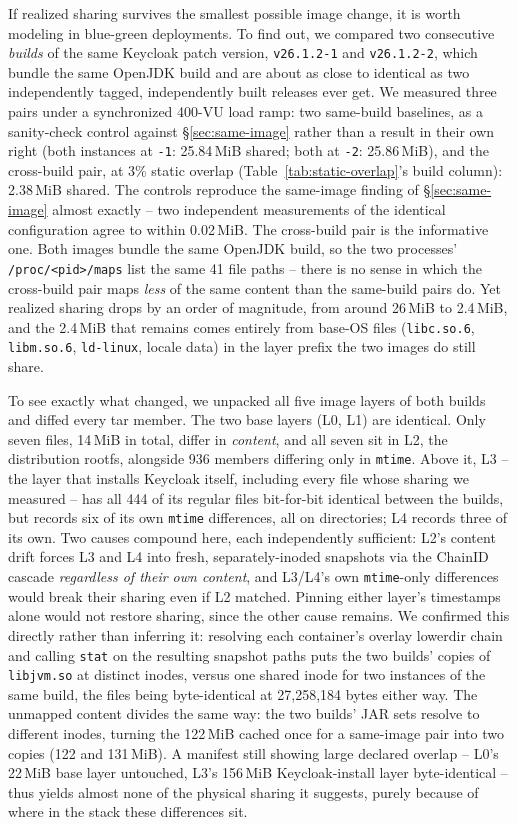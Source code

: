 \documentclass[sigplan,10pt,natbib=false]{acmart}
\newcommand{\procpath}[1]{\texttt{/proc/\allowbreak<pid>/\allowbreak#1}}
\begin{document}
If realized sharing survives the smallest possible image change, it is
worth modeling in blue-green deployments. To find out, we compared two consecutive
\emph{builds} of the same Keycloak patch version, \texttt{v26.1.2-1}
and \texttt{v26.1.2-2}, which bundle the same OpenJDK build and are
about as close to identical as two independently tagged, independently
built releases ever get. We measured three pairs under a synchronized
400-VU load ramp: two same-build baselines, as a sanity-check control
against \S\ref{sec:same-image} rather than a result in their own right
(both instances at \texttt{-1}: 25.84\,MiB shared; both at
\texttt{-2}: 25.86\,MiB), and the cross-build pair, at 3\% static
overlap (Table~\ref{tab:static-overlap}'s build column): 2.38\,MiB
shared. The controls reproduce the same-image finding of
\S\ref{sec:same-image} almost exactly -- two independent measurements
of the identical configuration agree to within 0.02\,MiB. The
cross-build pair is the informative one. Both images bundle the same
OpenJDK build, so the two processes'
\procpath{maps} list the same 41 file paths -- there is no
sense in which the cross-build pair maps \emph{less} of the same
content than the same-build pairs do. Yet realized sharing drops by an
order of magnitude, from around 26\,MiB to 2.4\,MiB, and the 2.4\,MiB
that remains comes entirely from base-OS files
(\texttt{libc.so.6}, \texttt{libm.so.6}, \texttt{ld-linux}, locale
data) in the layer prefix the two images do still share.

To see exactly what changed, we unpacked all five image layers of both
builds and diffed every tar member. The two base layers (L0, L1) are
identical. Only seven files, 14\,MiB in total, differ in
\emph{content}, and all seven sit in L2, the distribution rootfs,
alongside 936 members differing only in \texttt{mtime}. Above it, L3 --
the layer that installs Keycloak itself, including every file whose
sharing we measured -- has all 444 of its regular files bit-for-bit
identical between the builds, but records six of its own
\texttt{mtime} differences, all on directories; L4 records three of its
own. Two causes compound here, each independently sufficient: L2's
content drift forces L3 and L4 into fresh, separately-inoded snapshots
via the ChainID cascade \emph{regardless of their own content}, and
L3/L4's own \texttt{mtime}-only differences would break their sharing
even if L2 matched. Pinning either layer's timestamps alone would not
restore sharing, since the other cause remains. We confirmed this
directly rather than inferring it: resolving each
container's overlay lowerdir chain and calling \texttt{stat} on the
resulting snapshot paths puts the two builds' copies of
\texttt{libjvm.so} at distinct inodes, versus one shared inode for two
instances of the same build, the files being byte-identical at
27{,}258{,}184 bytes either way. The unmapped content divides the same
way: the two builds' JAR sets resolve to different inodes, turning the
122\,MiB cached once for a same-image pair into two copies (122 and
131\,MiB). A manifest still showing large declared overlap -- L0's
22\,MiB base layer untouched, L3's 156\,MiB Keycloak-install layer
byte-identical -- thus yields almost none of the physical sharing it
suggests, purely because of where in the stack these differences sit.
\end{document}
